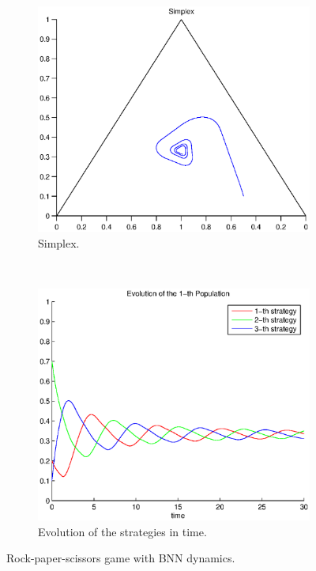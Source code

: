 \documentclass[a4paper,10pt]{article}
\begin{document}
\begin{figure}
  \centering
  \begin{subfigure}[b]{0.45\textwidth}
	  \includegraphics[width=\textwidth]{./images/test1_simplex_bnn.eps}
	  \caption{Simplex.}
	  \label{fig:test1_simplex_bnn}
  \end{subfigure}
  ~ 
  \begin{subfigure}[b]{0.45\textwidth}
	  \includegraphics[width=\textwidth]{./images/test1_ev_bnn.eps}
	  \caption{Evolution of the strategies in time.}
	  \label{fig:test1_ev_bnn}
  \end{subfigure}
  \caption{Rock-paper-scissors game with BNN dynamics.}
  \label{fig:rpc_game_bnn}
\end{figure}
\end{document}
